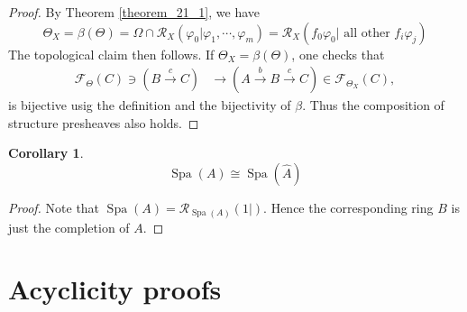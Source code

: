 \documentclass[8pt]{article}
\numberwithin{equation}{section}
\newtheorem{corollary}{Corollary} [subsection]
\DeclareMathOperator{\Spa}{Spa}
\newcommand{\Z}[0]{\mathbb{Z}}
\newcommand{\cR}[0]{\mathcal{R}}
\begin{document}
\begin{proof}
By Theorem \ref{theorem_21_1}, we have
\begin{equation*}
    \Theta_X = \beta(\Theta) = \Omega\cap\cR_X(\varphi_0|\varphi_1,\cdots,\varphi_m) = \cR_X(f_0\varphi_0|\text{ all other }f_i\varphi_j)
\end{equation*}
The topological claim then follows. If $\Theta_X = \beta(\Theta)$, one checks that 
\begin{align*}
    \mathcal{F}_\Theta(C)\ni(B\stackrel{c}{\to}C)&\rightarrow (A\stackrel{b}{\to}B\stackrel{c}{\to}C)\in\mathcal{F}_{\Theta_X}(C),
\end{align*}
is bijective usig the definition and the bijectivity of $\beta$. Thus the composition of structure presheaves also holds.
\end{proof}
\begin{corollary}
    \label{corollary_22_1}
    \begin{equation*}
        \Spa(A)\cong \Spa(\widehat{A})
    \end{equation*}
\end{corollary}
\begin{proof}
    Note that $\Spa(A) = \cR_{\Spa(A)}(1|)$. Hence the corresponding ring $B$ is just the completion of $A$.
\end{proof}


\section{Acyclicity proofs}
\end{document}
